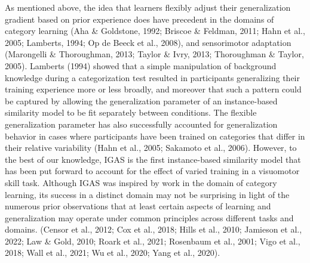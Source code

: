 \documentclass[
  man,floatsintext]{apa7}
\begin{document}
As mentioned above, the idea that learners flexibly adjust their generalization gradient based on prior experience does have precedent in the domains of category learning (Aha \& Goldstone, 1992; Briscoe \& Feldman, 2011; Hahn et al., 2005; Lamberts, 1994; Op de Beeck et al., 2008), and sensorimotor adaptation (Marongelli \& Thoroughman, 2013; Taylor \& Ivry, 2013; Thoroughman \& Taylor, 2005). Lamberts (1994) showed that a simple manipulation of background knowledge during a categorization test resulted in participants generalizing their training experience more or less broadly, and moreover that such a pattern could be captured by allowing the generalization parameter of an instance-based similarity model to be fit separately between conditions. The flexible generalization parameter has also successfully accounted for generalization behavior in cases where participants have been trained on categories that differ in their relative variability (Hahn et al., 2005; Sakamoto et al., 2006). However, to the best of our knowledge, IGAS is the first instance-based similarity model that has been put forward to account for the effect of varied training in a visuomotor skill task. Although IGAS was inspired by work in the domain of category learning, its success in a distinct domain may not be surprising in light of the numerous prior observations that at least certain aspects of learning and generalization may operate under common principles across different tasks and domains. (Censor et al., 2012; Cox et al., 2018; Hills et al., 2010; Jamieson et al., 2022; Law \& Gold, 2010; Roark et al., 2021; Rosenbaum et al., 2001; Vigo et al., 2018; Wall et al., 2021; Wu et al., 2020; Yang et al., 2020).
\end{document}
